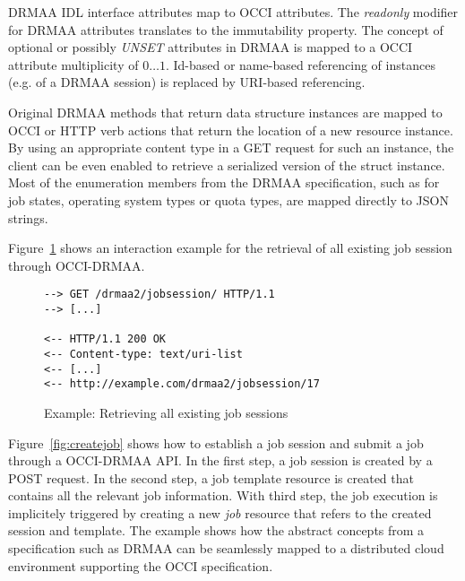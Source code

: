 \documentclass[twocolumn]{svjour3}       %
\begin{document}
DRMAA IDL interface attributes map to OCCI attributes. The \emph{readonly} modifier for DRMAA attributes translates to the immutability property. The concept of optional or possibly \emph{UNSET} attributes in DRMAA is mapped to a OCCI attribute multiplicity of $0\ldots1$. Id-based or name-based referencing of instances (e.g. of a DRMAA session) is replaced by URI-based referencing.

Original DRMAA methods that return data structure instances are mapped to OCCI or HTTP verb actions that return the location of a new resource instance. By using an appropriate content type in a GET request for such an instance, the client can be even enabled to retrieve a serialized version of the struct instance. Most of the enumeration members from the DRMAA specification, such as for job states, operating system types or quota types, are mapped directly to JSON strings. 

Figure~\ref{fig:getsessions} shows an interaction example for the retrieval of all existing job session through OCCI-DRMAA.

\begin{figure}
\begin{lstlisting}
--> GET /drmaa2/jobsession/ HTTP/1.1
--> [...]

<-- HTTP/1.1 200 OK 
<-- Content-type: text/uri-list
<-- [...]
<-- http://example.com/drmaa2/jobsession/17
\end{lstlisting}
\caption{Example: Retrieving all existing job sessions}
\label{fig:getsessions} 
\end{figure}

Figure~\ref{fig:createjob} shows how to establish a job session and submit a job through a OCCI-DRMAA API. In the first step, a job session is created by a POST request. In the second step, a job template resource is created that contains all the relevant job information. With third step, the job execution is implicitely triggered by creating a new \emph{job} resource that refers to the created session and template. The example shows how the abstract concepts from a specification such as DRMAA can be seamlessly mapped to a distributed cloud environment supporting the OCCI specification.
\end{document}
